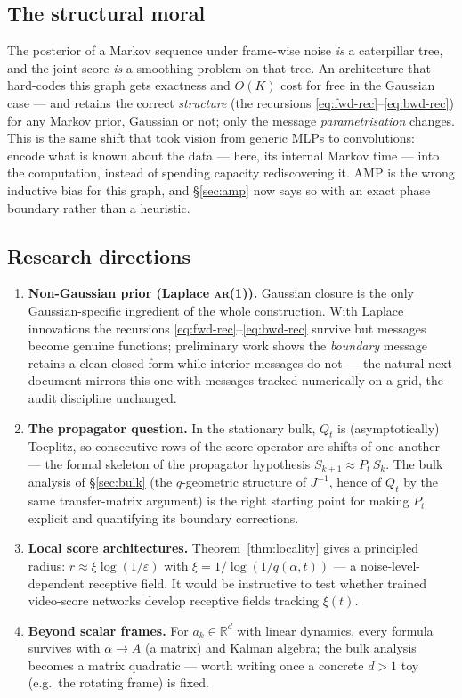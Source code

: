 \documentclass[11pt]{article}
\theoremstyle{definition}
\newcommand{\R}{\mathbb{R}}
\newcommand{\Qt}{Q_t}
\begin{document}
\subsection{The structural moral}

The posterior of a Markov sequence under frame-wise noise \emph{is} a
caterpillar tree, and the joint score \emph{is} a smoothing problem on that
tree. An architecture that hard-codes this graph gets exactness and $O(K)$
cost for free in the Gaussian case --- and retains the correct \emph{structure}
(the recursions \eqref{eq:fwd-rec}--\eqref{eq:bwd-rec}) for any Markov prior,
Gaussian or not; only the message \emph{parametrisation} changes. This is the
same shift that took vision from generic MLPs to convolutions: encode what is
known about the data --- here, its internal Markov time --- into the
computation, instead of spending capacity rediscovering it. AMP is the wrong
inductive bias for this graph, and \S\ref{sec:amp} now says so with an exact
phase boundary rather than a heuristic.

\subsection{Research directions}

\begin{enumerate}[leftmargin=1.6em, itemsep=2pt]
\item \textbf{Non-Gaussian prior (Laplace \textsc{ar}(1)).} Gaussian closure
is the only Gaussian-specific ingredient of the whole construction. With
Laplace innovations the recursions \eqref{eq:fwd-rec}--\eqref{eq:bwd-rec}
survive but messages become genuine functions; preliminary work shows the
\emph{boundary} message retains a clean closed form while interior messages do
not --- the natural next document mirrors this one with messages tracked
numerically on a grid, the audit discipline unchanged.
\item \textbf{The propagator question.} In the stationary bulk, $\Qt$ is
(asymptotically) Toeplitz, so consecutive rows of the score operator are
shifts of one another --- the formal skeleton of the propagator hypothesis
$S_{k+1}\approx P_t\,S_k$. The bulk analysis of \S\ref{sec:bulk} (the
$q$-geometric structure of $J^{-1}$, hence of $\Qt$ by the same
transfer-matrix argument) is the right starting point for making $P_t$
explicit and quantifying its boundary corrections.
\item \textbf{Local score architectures.} Theorem~\ref{thm:locality} gives a
principled radius: $r\approx\xi\log(1/\varepsilon)$ with
$\xi=1/\log(1/q(\alpha,t))$ --- a noise-level-dependent receptive field. It
would be instructive to test whether trained video-score networks develop
receptive fields tracking $\xi(t)$.
\item \textbf{Beyond scalar frames.} For $a_k\in\R^d$ with linear dynamics,
every formula survives with $\alpha\to A$ (a matrix) and Kalman algebra;
the bulk analysis becomes a matrix quadratic --- worth writing once a concrete
$d>1$ toy (e.g.\ the rotating frame) is fixed.
\end{enumerate}
\end{document}
